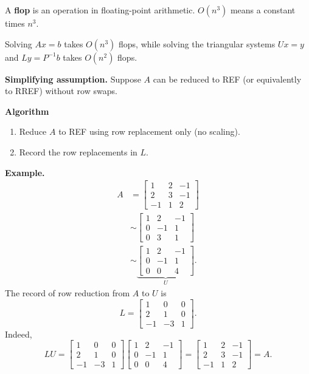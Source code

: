 \documentclass{article}
\begin{document}
\medskip

A \textbf{flop} is an operation in floating-point arithmetic. $O(n^3)$ means a constant times $n^3$.

\medskip

Solving $Ax=b$ takes $O(n^3)$ flops, while solving the triangular systems $Ux=y$ and $Ly=P^{-1}b$ takes $O(n^2)$ flops.

\bigskip

\textbf{Simplifying assumption.} Suppose $A$ can be reduced to REF (or equivalently to RREF) without row swaps.

\medskip

\textbf{Algorithm}
\begin{enumerate}
\item Reduce $A$ to REF using row replacement only (no scaling).
\item Record the row replacements in $L$.
\end{enumerate}

\bigskip

\textbf{Example.}
\begin{align*}
A&=\begin{bmatrix}1&2&-1\\2&3&-1\\-1&1&2\end{bmatrix} \\
&\sim\begin{bmatrix}1&2&-1\\0&-1&1\\0&3&1\end{bmatrix} \\
&\sim\underbrace{\begin{bmatrix}1&2&-1\\0&-1&1\\0&0&4\end{bmatrix}}_{U}.
\end{align*}
The record of row reduction from $A$ to $U$ is
\[
L=
\begin{bmatrix}1&0&0\\2&1&0\\-1&-3&1\end{bmatrix}.
\]
Indeed,
\[
LU=
\begin{bmatrix}1&0&0\\2&1&0\\-1&-3&1\end{bmatrix}
\begin{bmatrix}1&2&-1\\0&-1&1\\0&0&4\end{bmatrix}
=
\begin{bmatrix}1&2&-1\\2&3&-1\\-1&1&2\end{bmatrix}=A.
\]
\end{document}
